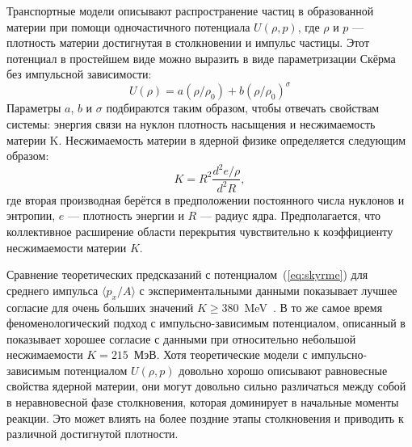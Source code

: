 Транспортные модели описывают распространение частиц в образованной материи при помощи одночастичного потенциала $U(\rho, p)$, где $\rho$ и $p$ --- плотность материи достигнутая в столкновении и импульс частицы.
Этот потенциал в простейшем виде можно выразить в виде параметризации Скёрма без импульсной зависимости:
\begin{equation}
    U(\rho) = a(\rho/\rho_0) + b(\rho/\rho_0)^\sigma
    \label{eq:skyrme}
\end{equation}
Параметры $a$, $b$ и $\sigma$ подбираются таким образом, чтобы отвечать свойствам системы: энергия связи на нуклон плотность насыщения и несжимаемость материи K.
Несжимаемость материи в ядерной физике определяется следующим образом:
\begin{equation}
    K = R^2 \frac{d^2 e/\rho}{ d^2 R },
\end{equation}
где вторая производная берётся в предположении постоянного числа нуклонов и энтропии, $e$ --- плотность энергии и $R$ --- радиус ядра.
Предполагается, что коллективное расширение области перекрытия чувствительно к коэффициенту несжимаемости материи $K$.

Сравнение теоретических предсказаний с потенциалом~(\ref{eq:skyrme}) для среднего импульса $\langle p_x / A \rangle$ с экспериментальными данными показывает лучшее согласие для очень больших значений $K \ge 380$~MeV~\cite{Kruse:1985hy, Molitoris:1985gs}.
В то же самое время феноменологический подход с импульсно-зависимым потенциалом, описанный в~\cite{Gale:1987zz, Aichelin:1987ti, Welke:1988zz, Haddad:1995vt} показывает хорошее согласие с данными при относительно небольшой несжимаемости $K=215$~МэВ.
Хотя теоретические модели с импульсно-зависимым потенциалом $U(\rho, p)$ довольно хорошо описывают равновесные свойства ядерной материи, они могут довольно сильно различаться между собой в неравновесной фазе столкновения, которая доминирует в начальные моменты реакции.
Это может влиять на более поздние этапы столкновения и приводить к различной достигнутой плотности.

